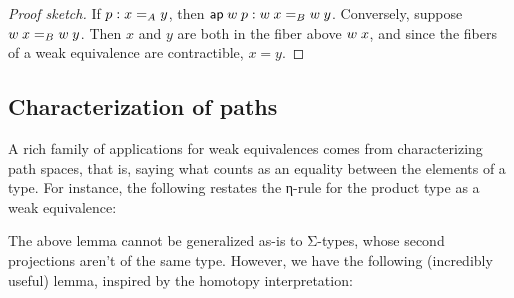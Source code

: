 \documentclass[./thesis.tex]{subfiles}
\begin{document}
\begin{proof}[Proof sketch]
  If $p:\propeq{A}{x}{y}$, then
  $\appply{\ap}{w}{p}:\propeq{B}{\apply{w}{x}}{\apply{w}{y}}$. Conversely,
  suppose $\propeq{B}{\apply{w}{x}}{\apply{w}{y}}$.
  Then $x$ and $y$ are both in the fiber above $\apply{w}{x}$,
  and since the fibers of a weak equivalence are contractible, $x=y$.
\end{proof}


\subsection{Characterization of paths}
\label{subsec:characterization-of-paths}

A rich family of applications for weak equivalences comes from characterizing
path spaces, that is, saying what counts as an equality between the elements of
a type. For instance, the following restates the η-rule for the product type as
a weak equivalence:


The above lemma cannot be generalized as-is to Σ-types, whose second projections
aren't of the same type. However, we have the following (incredibly useful)
lemma, inspired by the homotopy interpretation:
\end{document}
